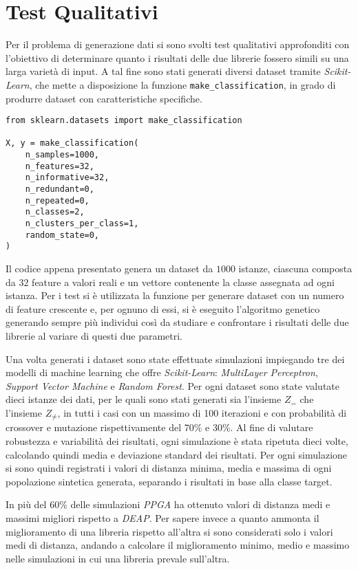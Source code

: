\section{Test Qualitativi}

Per il problema di generazione dati si sono svolti test qualitativi approfonditi
con l'obiettivo di determinare quanto i risultati delle due librerie fossero
simili su una larga varietà di input. A tal fine sono stati generati diversi
dataset tramite \textit{Scikit-Learn}, che mette a disposizione la funzione
\verb|make_classification|, in grado di produrre dataset con caratteristiche
specifiche.

\begin{lstlisting}[caption={Generazione dataset con \lstinline|make_classification|}]
from sklearn.datasets import make_classification

X, y = make_classification(
	n_samples=1000,
	n_features=32,
	n_informative=32,
	n_redundant=0,
	n_repeated=0,
	n_classes=2,
	n_clusters_per_class=1,
	random_state=0,
)
\end{lstlisting}

Il codice appena presentato genera un dataset da $1000$ istanze, ciascuna
composta da $32$ feature a valori reali e un vettore contenente la classe
assegnata ad ogni istanza. Per i test si è utilizzata la funzione per generare
dataset con un numero di feature crescente e, per ognuno di essi, si è eseguito
l'algoritmo genetico generando sempre più individui così da studiare e
confrontare i risultati delle due librerie al variare di questi due parametri.

Una volta generati i dataset sono state effettuate simulazioni impiegando tre
dei modelli di machine learning che offre \textit{Scikit-Learn}:
\textit{MultiLayer Perceptron}, \textit{Support Vector Machine} e
\textit{Random Forest}. Per ogni dataset sono state valutate dieci istanze dei
dati, per le quali sono stati generati sia l'insieme $Z_=$ che l'insieme
$Z_{\neq}$, in tutti i casi con un massimo di 100 iterazioni e con probabilità
di crossover e mutazione rispettivamente del 70\% e 30\%. Al fine di valutare
robustezza e variabilità dei risultati, ogni simulazione è stata ripetuta dieci
volte, calcolando quindi media e deviazione standard dei risultati. Per ogni
simulazione si sono quindi registrati i valori di distanza minima, media e
massima di ogni popolazione sintetica generata, separando i risultati in base
alla classe target.

In più del 60\% delle simulazioni \textit{PPGA} ha ottenuto valori di distanza
medi e massimi migliori rispetto a \textit{DEAP}. Per sapere invece a quanto
ammonta il miglioramento di una libreria rispetto all'altra si sono considerati
solo i valori medi di distanza, andando a calcolare il miglioramento minimo,
medio e massimo nelle simulazioni in cui una libreria prevale sull'altra.

